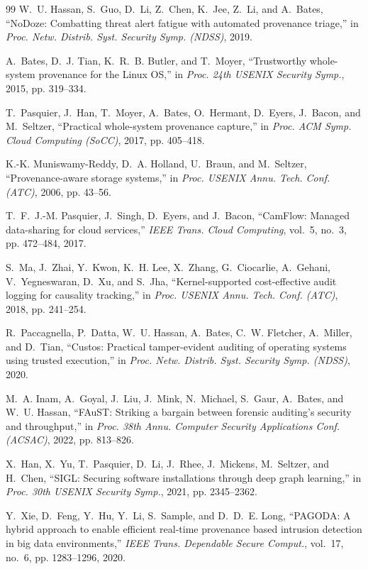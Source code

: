 \documentclass[lettersize,journal]{IEEEtran}
\begin{document}
\begin{thebibliography}{99}
W.~U. Hassan, S.~Guo, D.~Li, Z.~Chen, K.~Jee, Z.~Li, and A.~Bates, ``NoDoze:
Combatting threat alert fatigue with automated provenance triage,'' in
\emph{Proc. Netw. Distrib. Syst. Security Symp. (NDSS)}, 2019.

A.~Bates, D.~J. Tian, K.~R.~B. Butler, and T.~Moyer, ``Trustworthy whole-system
provenance for the Linux OS,'' in \emph{Proc. 24th USENIX Security Symp.}, 2015,
pp. 319--334.

T.~Pasquier, J.~Han, T.~Moyer, A.~Bates, O.~Hermant, D.~Eyers, J.~Bacon, and
M.~Seltzer, ``Practical whole-system provenance capture,'' in \emph{Proc. ACM
Symp. Cloud Computing (SoCC)}, 2017, pp. 405--418.

K.-K. Muniswamy-Reddy, D.~A. Holland, U.~Braun, and M.~Seltzer,
``Provenance-aware storage systems,'' in \emph{Proc. USENIX Annu. Tech. Conf.
(ATC)}, 2006, pp. 43--56.

T.~F.~J.-M. Pasquier, J.~Singh, D.~Eyers, and J.~Bacon, ``CamFlow: Managed
data-sharing for cloud services,'' \emph{IEEE Trans. Cloud Computing}, vol.~5,
no.~3, pp. 472--484, 2017.

S.~Ma, J.~Zhai, Y.~Kwon, K.~H. Lee, X.~Zhang, G.~Ciocarlie, A.~Gehani,
V.~Yegneswaran, D.~Xu, and S.~Jha, ``Kernel-supported cost-effective audit
logging for causality tracking,'' in \emph{Proc. USENIX Annu. Tech. Conf.
(ATC)}, 2018, pp. 241--254.

R.~Paccagnella, P.~Datta, W.~U. Hassan, A.~Bates, C.~W. Fletcher, A.~Miller,
and D.~Tian, ``Custos: Practical tamper-evident auditing of operating systems
using trusted execution,'' in \emph{Proc. Netw. Distrib. Syst. Security Symp.
(NDSS)}, 2020.

M.~A. Inam, A.~Goyal, J.~Liu, J.~Mink, N.~Michael, S.~Gaur, A.~Bates, and
W.~U. Hassan, ``FAuST: Striking a bargain between forensic auditing's security
and throughput,'' in \emph{Proc. 38th Annu. Computer Security Applications Conf.
(ACSAC)}, 2022, pp. 813--826.

X.~Han, X.~Yu, T.~Pasquier, D.~Li, J.~Rhee, J.~Mickens, M.~Seltzer, and
H.~Chen, ``SIGL: Securing software installations through deep graph learning,''
in \emph{Proc. 30th USENIX Security Symp.}, 2021, pp. 2345--2362.

Y.~Xie, D.~Feng, Y.~Hu, Y.~Li, S.~Sample, and D.~D.~E. Long, ``PAGODA: A
hybrid approach to enable efficient real-time provenance based intrusion
detection in big data environments,'' \emph{IEEE Trans. Dependable Secure
Comput.}, vol.~17, no.~6, pp. 1283--1296, 2020.


\end{thebibliography}
\end{document}
